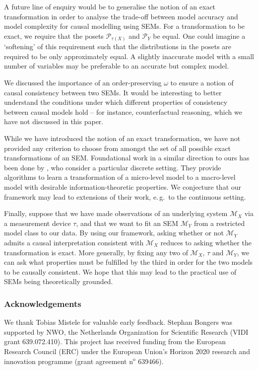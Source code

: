 A future line of enquiry would be to generalise the notion of an exact transformation in order to analyse the trade-off between model accuracy and model complexity for causal modelling using SEMs.
For a transformation to be exact, we require that the posets $\mathcal{P}_{\tau(X)}$ and $\mathcal{P}_Y$ be equal. One could imagine a `softening' of this requirement such that the distributions in the posets are required to be only approximately equal.
A slightly inaccurate model with a small number of variables may be preferable to an accurate but complex model.

We discussed the importance of an order-preserving $\omega$ to ensure a notion of causal consistency between two SEMs.
It would be interesting to better understand the conditions under which different properties of consistency between causal models hold -- for instance, counterfactual reasoning, which we have not discussed in this paper.

While we have introduced the notion of an exact transformation, we have not provided any criterion to choose from amongst the set of all possible exact transformations of an SEM. Foundational work in a similar direction to ours has been done by \cite{chalupka2015visual,chalupka2016multi}, who consider a particular discrete setting.
They provide algorithms to learn a transformation of a micro-level model to a macro-level model with desirable information-theoretic properties.
We conjecture that our framework may lead to extensions of their work, e.\,g.\ to the continuous setting.

Finally, suppose that we have made observations of an underlying system $\mathcal{M}_X$ via a measurement device $\tau$, and that we want to fit an SEM $\mathcal{M}_Y$ from a restricted model class to our data.
By using our framework, asking whether or not $\mathcal{M}_Y$ admits a causal interpretation consistent with $\mathcal{M}_X$ reduces to asking whether the transformation is exact.
More generally, by fixing any two of $\mathcal{M}_X$, $\tau$ and $\mathcal{M}_Y$, we can ask what properties must be fulfilled by the third in order for the two models to be causally consistent.
We hope that this may lead to the practical use of SEMs being theoretically grounded.

\subsubsection*{Acknowledgements}

We thank Tobias Mistele for valuable early feedback.
Stephan Bongers was supported by NWO, the Netherlands Organization for Scientific Research (VIDI grant 639.072.410).
This project has received funding from the European Research Council (ERC) under the European Union's Horizon 2020 research and innovation programme (grant agreement n$^{\mathrm{o}}$ 639466).





